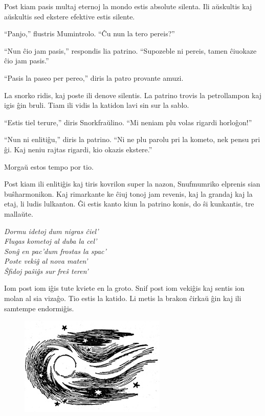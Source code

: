 Post kiam pasis multaj eternoj la mondo estis absolute silenta. Ili aŭskultis kaj aŭskultis sed ekstere efektive estis silente.

``Panjo,'' flustris Mumintrolo. ``Ĉu nun la tero pereis?''

``Nun ĉio jam pasis,'' respondis lia patrino. ``Supozeble ni pereis, tamen ĉiuokaze ĉio jam pasis.''

``Pasis la paseo per pereo,'' diris la patro provante amuzi.

La snorko ridis, kaj poste ili denove silentis. La patrino trovis la petrollampon kaj igis ĝin bruli. Tiam ili vidis la katidon lavi sin sur la sablo.

``Estis tiel terure,'' diris Snorkfraŭlino. ``Mi neniam plu volas rigardi horloĝon!''

``Nun ni enlitiĝu,'' diris la patrino. ``Ni ne plu parolu pri la kometo, nek pensu pri ĝi. Kaj neniu rajtas rigardi, kio okazis ekstere.''

Morgaŭ estos tempo por tio.

Post kiam ili enlitiĝis kaj tiris kovrilon super la nazon, Snufmumriko elprenis sian buŝharmonikon. Kaj rimarkante ke ĉiuj tonoj jam revenis, kaj la grandaj kaj la etaj, li ludis lulkanton. Ĝi estis kanto kiun la patrino konis, do ŝi kunkantis, tre mallaŭte.

\begin{center}\itshape Dormu idetoj dum nigras ĉiel'\\
Flugas kometoj al duba la cel'\\
Sonĝ en pac'dum frostas la spac'\\
Poste vekiĝ al nova maten'\\
Ŝfidoj paŝiĝs sur freŝ teren'\\\end{center}

Iom post iom iĝis tute kviete en la groto. Snif post iom vekiĝis kaj sentis ion molan al sia vizaĝo. Tio estis la katido. Li metis la brakon ĉirkaŭ ĝin kaj ili samtempe endormiĝis.

\begin{figure}[htbp]
\centering
\includegraphics[width=198pt,height=134pt]{9-13.png}
\caption{}
\label{9-13}
\end{figure}

